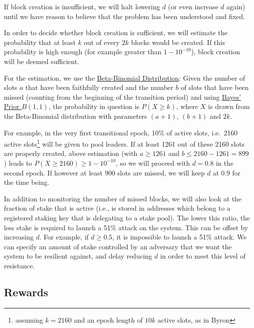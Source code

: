 \documentclass[11pt,a4paper]{article}
\begin{document}
If block creation is insufficient, we will halt lowering \(d\) (or even
increase \(d\) again) until we have reason to believe that the problem
has been understood and fixed.

In order to decide whether block creation is sufficient, we will
estimate the probability that at least \(k\) out of every \(2k\) blocks
would be created. If this probability is high enough (for example
greater than \(1 - 10^{-10}\)), block creation will be deemed
sufficient.

For the estimation, we use the
\href{https://en.wikipedia.org/wiki/Beta-binomial_distribution}{Beta-Binomial
Distribution}: Given the number of slots \(a\) that have been faithfully
created and the number \(b\) of slots that have been missed (counting
from the beginning of the transition period) and using
\href{https://en.wikipedia.org/wiki/Beta_distribution\#Bayes'_prior_probability_(Beta(1,1))}{Bayes'
Prior \(B(1,1)\)}, the probability in question is \(P(X\geq k)\),
where \(X\) is drawn from the Beta-Binomial distribution with parameters
\((a + 1)\), \((b + 1)\) and \(2k\).

For example, in the very first transitional epoch, 10\% of active slots,
i.e.~2160 active slots\footnote{assuming \(k=2160\) and an epoch length of
  \(10k\) active slots, as in Byron} will be given to pool leaders. If at least
1261 out of these 2160 slots are properly created, above estimation (with
\(a\geq 1261\) and \(b\leq 2160-1261=899\)) leads to \(P(X\geq 2160)\geq
1-10^{-10}\), so we will proceed with \(d=0.8\) in the second epoch. If however
at least 900 slots are missed, we will keep \(d\) at \(0.9\) for the time being.

In addition to monitoring the number of missed blocks, we will also look
at the fraction of stake that is active (i.e., is stored in addresses
which belong to a registered staking key that is delegating to a stake
pool). The lower this ratio, the less stake is required to launch a 51\%
attack on the system. This can be offset by increasing \(d\). For
example, if \(d \geq 0.5\), it is impossible to launch a 51\% attack. We
can specify an amount of stake controlled by an adversary that we want
the system to be resilient against, and delay reducing \(d\) in order to
meet this level of resistance.

\subsection{Rewards}
\label{rewards}
\end{document}
